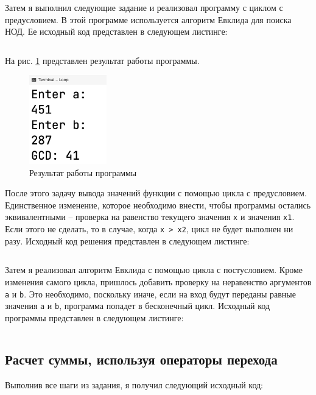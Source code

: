 \documentclass[a4paper,14pt]{extarticle}
\numberwithin{figure}{section}
\begin{document}
Затем я выполнил следующие задание и реализовал программу с циклом с предусловием. В этой программе используется алгоритм Евклида для поиска НОД. Ее исходный код представлен в следующем листинге:

\inputminted{csharp}{../Loop/Loop/Program2.cs}

На рис. \ref{fig:task-4-3} представлен результат работы программы.

\begin{figure}[H]
    \centering
    \includegraphics[width=0.3\textwidth]{images/task-4-3.png}
    \caption{Результат работы программы}
    \label{fig:task-4-3}
\end{figure}

После этого задачу вывода значений функции с помощью цикла с предусловием. Единственное изменение, которое необходимо внести, чтобы программы остались эквивалентными -- проверка на равенство текущего значения \texttt{x} и значения \texttt{x1}. Если этого не сделать, то в случае, когда \texttt{x > x2}, цикл не будет выполнен ни разу. Исходный код решения представлен в следующем листинге:

\inputminted{csharp}{../Loop/Loop/Program4.cs}

Затем я реализовал алгоритм Евклида с помощью цикла с постусловием. Кроме изменения самого цикла, пришлось добавить проверку на неравенство аргументов \texttt{a} и \texttt{b}. Это необходимо, поскольку иначе, если на вход будут переданы равные значения \texttt{a} и \texttt{b}, программа попадет в бесконечный цикл. Исходный код программы представлен в следующем листинге:

\inputminted{csharp}{../Loop/Loop/Program3.cs}

\subsection{Расчет суммы, используя операторы перехода}


Выполнив все шаги из задания, я получил следующий исходный код:

\inputminted{csharp}{../Sum/Sum/Program.cs}
\end{document}
